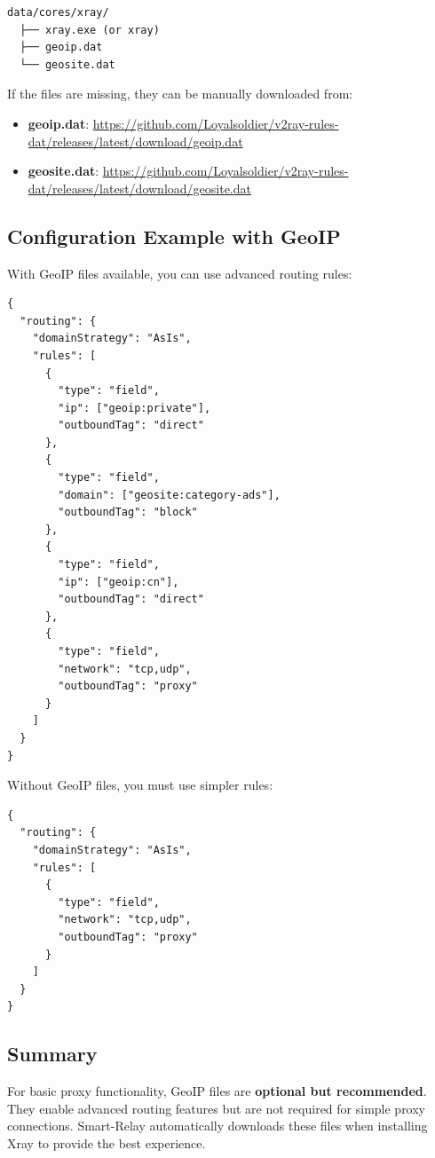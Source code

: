\begin{verbatim}
data/cores/xray/
  ├── xray.exe (or xray)
  ├── geoip.dat
  └── geosite.dat
\end{verbatim}

If the files are missing, they can be manually downloaded from:
\begin{itemize}
    \item \textbf{geoip.dat}: \url{https://github.com/Loyalsoldier/v2ray-rules-dat/releases/latest/download/geoip.dat}
    \item \textbf{geosite.dat}: \url{https://github.com/Loyalsoldier/v2ray-rules-dat/releases/latest/download/geosite.dat}
\end{itemize}

\subsection{Configuration Example with GeoIP}

With GeoIP files available, you can use advanced routing rules:

\begin{verbatim}
{
  "routing": {
    "domainStrategy": "AsIs",
    "rules": [
      {
        "type": "field",
        "ip": ["geoip:private"],
        "outboundTag": "direct"
      },
      {
        "type": "field",
        "domain": ["geosite:category-ads"],
        "outboundTag": "block"
      },
      {
        "type": "field",
        "ip": ["geoip:cn"],
        "outboundTag": "direct"
      },
      {
        "type": "field",
        "network": "tcp,udp",
        "outboundTag": "proxy"
      }
    ]
  }
}
\end{verbatim}

Without GeoIP files, you must use simpler rules:

\begin{verbatim}
{
  "routing": {
    "domainStrategy": "AsIs",
    "rules": [
      {
        "type": "field",
        "network": "tcp,udp",
        "outboundTag": "proxy"
      }
    ]
  }
}
\end{verbatim}

\subsection{Summary}

For basic proxy functionality, GeoIP files are \textbf{optional but recommended}. They enable advanced routing features but are not required for simple proxy connections. Smart-Relay automatically downloads these files when installing Xray to provide the best experience.

